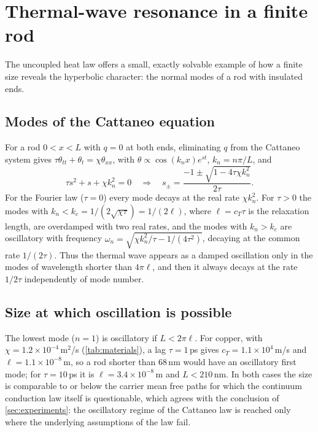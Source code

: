 \section{Thermal-wave resonance in a finite rod}\label{sec:thermalmodes}

The uncoupled heat law offers a small, exactly solvable example of how a finite size reveals the hyperbolic character: the normal modes of a rod with insulated ends.

\subsection{Modes of the Cattaneo equation}
For a rod $0<x<L$ with $q=0$ at both ends, eliminating $q$ from the Cattaneo system gives $\tau\theta_{tt}+\theta_t=\chi\theta_{xx}$, with $\theta\propto\cos(k_nx)e^{st}$, $k_n=n\pi/L$, and
\begin{equation}
\tau s^2+s+\chi k_n^2=0\quad\Rightarrow\quad s_\pm=\frac{-1\pm\sqrt{1-4\tau\chi k_n^2}}{2\tau}.
\end{equation}
For the Fourier law ($\tau=0$) every mode decays at the real rate $\chi k_n^2$. For $\tau>0$ the modes with $k_n<k_c=1/(2\sqrt{\chi\tau})=1/(2\ell)$, where $\ell=c_T\tau$ is the relaxation length, are overdamped with two real rates, and the modes with $k_n>k_c$ are oscillatory with frequency $\omega_n=\sqrt{\chi k_n^2/\tau-1/(4\tau^2)}$, decaying at the common rate $1/(2\tau)$. Thus the thermal wave appears as a damped oscillation only in the modes of wavelength shorter than $4\pi\ell$, and then it always decays at the rate $1/2\tau$ independently of mode number.

\subsection{Size at which oscillation is possible}
The lowest mode ($n=1$) is oscillatory if $L<2\pi\ell$. For copper, with $\chi=1.2\times10^{-4}$\,m$^2$/s (\cref{tab:materials}), a lag $\tau=1$\,ps gives $c_T=1.1\times10^{4}$\,m/s and $\ell=1.1\times10^{-8}$\,m, so a rod shorter than $68$\,nm would have an oscillatory first mode; for $\tau=10$\,ps it is $\ell=3.4\times10^{-8}$\,m and $L<210$\,nm. In both cases the size is comparable to or below the carrier mean free paths for which the continuum conduction law itself is questionable, which agrees with the conclusion of \cref{sec:experiments}: the oscillatory regime of the Cattaneo law is reached only where the underlying assumptions of the law fail.

